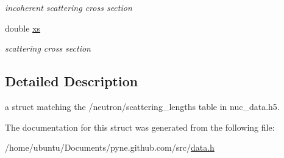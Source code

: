 \begin{DoxyCompactItemize}
\begin{DoxyCompactList}\small\item\em incoherent scattering cross section \end{DoxyCompactList}\item 
double \hyperlink{structpyne_1_1scattering__lengths_aaaab6ef13d13f4058b263f0d28da9ac3}{xs}\hypertarget{structpyne_1_1scattering__lengths_aaaab6ef13d13f4058b263f0d28da9ac3}{}\label{structpyne_1_1scattering__lengths_aaaab6ef13d13f4058b263f0d28da9ac3}

\begin{DoxyCompactList}\small\item\em scattering cross section \end{DoxyCompactList}\end{DoxyCompactItemize}


\subsection{Detailed Description}
a struct matching the \textquotesingle{}/neutron/scattering\+\_\+lengths\textquotesingle{} table in nuc\+\_\+data.\+h5. 

The documentation for this struct was generated from the following file\+:\begin{DoxyCompactItemize}
\item 
/home/ubuntu/\+Documents/pyne.\+github.\+com/src/\hyperlink{data_8h}{data.\+h}\end{DoxyCompactItemize}
